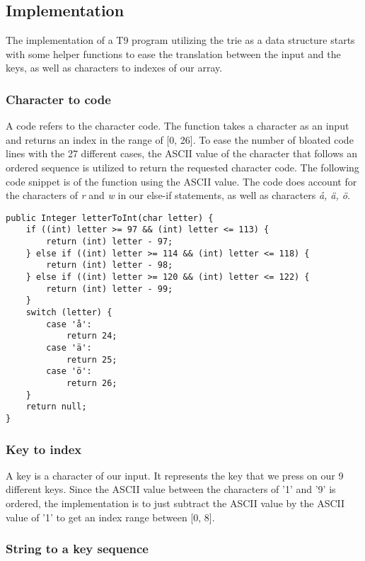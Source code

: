 \documentclass[a4paper,11pt]{article}
\begin{document}
    \subsection*{Implementation}

        The implementation of a T9 program utilizing the trie as a data structure starts with some helper functions to ease the translation between the input and the keys, as well as characters to indexes of our array. 

        \subsubsection*{Character to code}

            A code refers to the character code. The function takes a character as an input and returns an index in the range of [0, 26]. To ease the number of bloated code lines with the 27 different cases, the ASCII value of the character that follows an ordered sequence is utilized to return the requested character code. The following code snippet is of the function using the ASCII value. The code does account for the characters of \textit{r} and \textit{w} in our else-if statements, as well as characters \textit{å, ä, ö}.
\begin{verbatim}
public Integer letterToInt(char letter) {
    if ((int) letter >= 97 && (int) letter <= 113) {
        return (int) letter - 97;
    } else if ((int) letter >= 114 && (int) letter <= 118) {
        return (int) letter - 98;
    } else if ((int) letter >= 120 && (int) letter <= 122) {
        return (int) letter - 99;
    }
    switch (letter) {
        case 'å':
            return 24;
        case 'ä':
            return 25;
        case 'ö':
            return 26;
    }
    return null;
}
\end{verbatim}

        \subsubsection*{Key to index}

            A key is a character of our input. It represents the key that we press on our 9 different keys. Since the ASCII value between the characters of '1' and '9' is ordered, the implementation is to just subtract the ASCII value by the ASCII value of '1' to get an index range between [0, 8].

        \subsubsection*{String to a key sequence}
\end{document}
